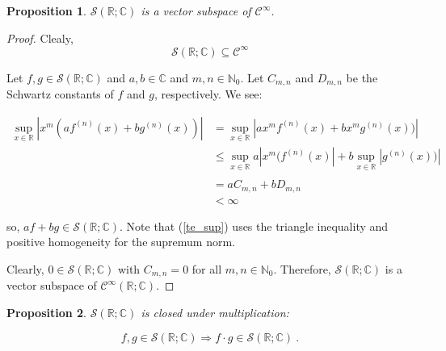\documentclass[12pt, reqno]{amsart}
\newtheorem{prop}{Proposition}[section]
\theoremstyle{definition}
\theoremstyle{remark}
\begin{document}
\begin{itemize}
\begin{itemize}
\begin{prop}
    $\mathcal{S}(\mathbb{R;C})$ is a vector subspace of $\mathcal{C}^\infty$.
\end{prop}

\begin{proof}

    Clealy, 
    \[
        \mathcal{S}(\mathbb{R;C})\subseteq\mathcal{C}^\infty
    \]

    Let $f,g\in\mathcal{S}(\mathbb{R};\mathbb{C})$ and $a,b\in \mathbb{C}$ and $m,n\in \mathbb{N}_{0}$. Let $C_{m,n}$ and $D_{m,n}$ be the Schwartz constants of $f$ and $g$, respectively. We see: 
    
    \begin{align}
\sup_{x\in\mathbb{R}}\left|x^{m}(af^{(n)}(x)+bg^{(n)}(x))\right|&= \sup_{x\in\mathbb{R}}\left|ax^{m}f^{(n)}(x)+bx^{m}g^{(n)}(x))\right|\\
&\le \sup_{x\in\mathbb{R}}a\left|x^{m}(f^{(n)}(x)\right|+b\sup_{x\in\mathbb{R}}\left|g^{(n)}(x))\right| \label{te_sup}\\
\\&= aC_{m,n}+bD_{m,n}\\
&< \infty
\end{align}

so, $af+bg\in\mathcal{S}(\mathbb{R};\mathbb{C})$. Note that (\ref{te_sup}) uses the triangle inequality and positive homogeneity for the supremum norm. 

\vspace*{10 pt}

Clearly, $0\in\mathcal{S}(\mathbb{R};\mathbb{C})$ with $C_{m,n}=0$ for all $m,n\in \mathbb{N}_{0}$. Therefore, $\mathcal{S}(\mathbb{R;C})$ is a vector subspace of $\mathcal{C}^\infty(\mathbb{R;C})$.
    
\end{proof}

\begin{prop}
    $\mathcal{S}(\mathbb{R;C})$ is closed under multiplication: 

\begin{equation}
f,g \in \mathcal{S}(\mathbb{R}; \mathbb{C}) \Longrightarrow f \cdot g \in \mathcal{S}(\mathbb{R}; \mathbb{C}) ~\mbox{.}
\end{equation}
\end{prop}


\end{itemize}
\end{itemize}
\end{document}
